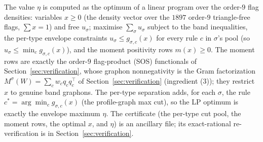 The value $\eta$ is computed as the optimum of a linear program over the order-$9$
flag densities: variables $x\ge 0$ (the density vector over the $1897$ order-$9$
triangle-free flags, $\sum x=1$) and free $u_\sigma$; maximise $\sum_\sigma u_\sigma$
subject to the band inequalities, the per-type envelope constraints
$u_\sigma\le g_{\sigma,c}(x)$ for every rule $c$ in $\sigma$'s pool (so
$u_\sigma\le\min_c g_{\sigma,c}(x)$), and the moment positivity rows $m(x)\ge 0$.
The moment rows are exactly the order-$9$ flag-product (SOS) functionals of
Section~\ref{sec:verification}, whose graphon nonnegativity is the Gram
factorization $M^\sigma(W)=\sum_c w_c q_c q_c^\top$ of Section~\ref{sec:verification}
(ingredient (3)); they restrict $x$ to genuine band graphons. The per-type
separation adds, for each $\sigma$, the rule $c^\ast=\arg\min_c g_{\sigma,c}(x)$
(the profile-graph max cut), so the LP optimum is exactly the envelope maximum
$\eta$. The certificate (the per-type cut pool, the moment rows, the optimal $x$,
and $\eta$) is an ancillary file; its exact-rational re-verification is in
Section~\ref{sec:verification}.

